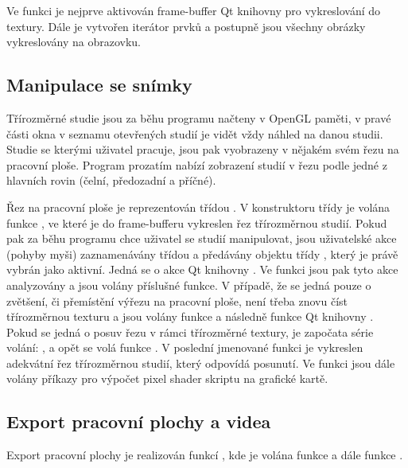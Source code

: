 Ve funkci  je nejprve aktivován frame-buffer Qt knihovny pro vykreslování do textury. Dále je vytvořen iterátor prvků  a postupně jsou všechny obrázky vykreslovány na obrazovku.
 

\subsection*{Manipulace se snímky}
Třírozměrné studie jsou za běhu programu načteny v OpenGL paměti, v pravé části okna v seznamu otevřených studií je vidět vždy náhled na danou studii. Studie se kterými uživatel pracuje, jsou pak vyobrazeny v nějakém svém řezu na pracovní ploše. Program prozatím nabízí zobrazení studií v řezu podle jedné z hlavních rovin (čelní, předozadní a příčné).

Řez na pracovní ploše je reprezentován třídou . V konstruktoru třídy je volána funkce , ve které je do frame-bufferu vykreslen řez třírozměrnou studií. Pokud pak za běhu programu chce uživatel se studií manipulovat, jsou uživatelské akce (pohyby myši) zaznamenávány třídou  a předávány objektu třídy , který je právě vybrán jako aktivní. Jedná se o akce Qt knihovny . Ve funkci  jsou pak tyto akce analyzovány a jsou volány příslušné funkce. V případě, že se jedná pouze o zvětšení, či přemístění výřezu na pracovní ploše, není třeba znovu číst třírozměrnou texturu a jsou volány funkce  a následně funkce Qt knihovny . Pokud se jedná o posuv řezu v rámci třírozměrné textury, je započata série volání: ,  a opět se volá funkce . V poslední jmenované funkci je vykreslen adekvátní řez třírozměrnou studií, který odpovídá posunutí. Ve funkci jsou dále volány příkazy pro výpočet pixel shader skriptu na grafické kartě.

\subsection*{Export pracovní plochy a videa}
Export pracovní plochy je realizován funkcí , kde je volána funkce  a dále funkce .

